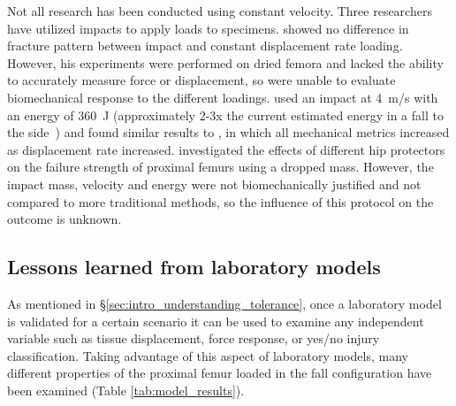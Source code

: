Not all research has been conducted using constant velocity.
Three researchers~\citep{backman_proximal_1957, weber_proximal_1992, okuizumi_effect_1998} have utilized impacts to apply loads to specimens.
\citet{backman_proximal_1957} showed no difference in fracture pattern between impact and constant displacement rate loading.
However, his experiments were performed on dried femora and lacked the ability to accurately measure force or displacement, so were unable to evaluate biomechanical response to the different loadings.
\citet{weber_proximal_1992} used an impact at 4~\ac{m}/\ac{s} with an energy of 360~J (approximately 2-3x the current estimated energy in a fall to the side~\citep{robinovitch_distribution_1997, feldman_reducing_2007}) and found similar results to \citet{courtney_effects_1994}, in which all mechanical metrics increased as displacement rate increased.
\citet{okuizumi_effect_1998} investigated the effects of different hip protectors on the failure strength of proximal femurs using a dropped mass.
However, the impact mass, velocity and energy were not biomechanically justified and not compared to more traditional methods, so the influence of this protocol on the outcome is unknown.

\subsection{Lessons learned from laboratory models}
\label{sec:intro_understanding_modelling_lab_results}
As mentioned in \S\ref{sec:intro_understanding_tolerance}, once a laboratory model is validated for a certain scenario it can be used to examine any independent variable such as tissue displacement, force response, or yes/no injury classification.
Taking advantage of this aspect of laboratory models, many different properties of the proximal femur loaded in the fall configuration have been examined (Table \ref{tab:model_results}).

\let\thempfootnote\thefootnote
\def\arraystretch{1.5}

